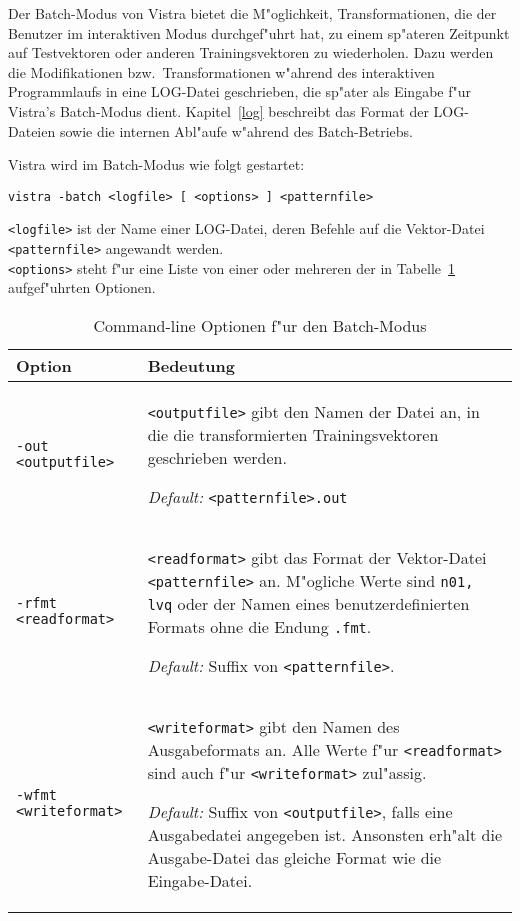 Der Batch-Modus von Vistra bietet die M"oglichkeit, Transformationen,
die der Benutzer im interaktiven Modus durchgef"uhrt hat, zu einem
sp"ateren Zeitpunkt auf Testvektoren oder anderen Trainingsvektoren 
zu wiederholen.
Dazu werden die Modifikationen bzw.~Transformationen w"ahrend des
interaktiven Programmlaufs in eine LOG-Datei geschrieben, die sp"ater
als Eingabe f"ur Vistra's Batch-Modus dient. 
Kapitel~\ref{log} beschreibt das Format der LOG-Dateien sowie die 
internen Abl"aufe w"ahrend des Batch-Betriebs.

Vistra wird im Batch-Modus wie folgt gestartet:
   
\nopagebreak
{\tt vistra -batch <logfile> [ <options> ] <patternfile>}

\begin{sloppypar}
{\tt <logfile>} ist der Name einer LOG-Datei, deren Befehle auf die
Vektor-Datei {\tt <patternfile>} angewandt werden. \\
{\tt <options>} steht f"ur eine Liste von einer oder mehreren der
in Tabelle~\ref{batchoptions} aufgef"uhrten Optionen.
\end{sloppypar}
 
\begin{table}[ht]
\begin{tabular}[t]{lp{10.2cm}}
{\bf Option} & {\bf Bedeutung} \\ \hline
{\tt -out} {\tt <outputfile>} &
{\tt <outputfile>} gibt den Namen der Datei an, in die die transformierten
Trainingsvektoren geschrieben werden. 

{\sl Default:} {\tt <patternfile>.out} \\
{\tt -rfmt} {\tt <readformat>} &
{\tt <readformat>} gibt das Format der Vek\-tor-Da\-tei {\tt <patternfile>} an.
M"ogliche Werte sind {\tt n01, lvq} oder der Namen eines benutzerdefinierten
Formats ohne die Endung {\tt .fmt}. 

{\sl Default:} Suffix von {\tt <patternfile>}. \\
{\tt -wfmt} {\tt <writeformat>} &
{\tt <writeformat>} gibt den Namen des Ausgabeformats an.
Alle Werte f"ur {\tt <readformat>} sind auch f"ur {\tt <writeformat>}
zul"assig. 

{\sl Default:} Suffix von {\tt <outputfile>}, falls eine Ausgabedatei 
angegeben ist. 
Ansonsten erh"alt die Ausgabe-Datei das gleiche Format wie die Eingabe-Datei.
\end{tabular}
\caption{\label{batchoptions} Command-line Optionen f"ur den Batch-Modus}
\end{table}






